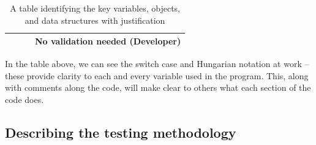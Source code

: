 \documentclass[9pt]{article}
\begin{document}
\begin{table}[H]
\begin{tabularx}{\textwidth}{llXX}
		                       &                    &                                                                                                                                                   & No validation needed (Developer)                                                                                     \\ \hline
	\end{tabularx}
	\caption{A table identifying the key variables, objects, and data structures with justification}
	\label{tab_keyItems}
\end{table}
In the table above, we can see the switch case and Hungarian notation at work -- these provide clarity to each and every variable used in the program. This, along with comments along the code, will make clear to others what each section of the code does.









\newpage
\subsection{Describing the testing methodology}
\end{document}
